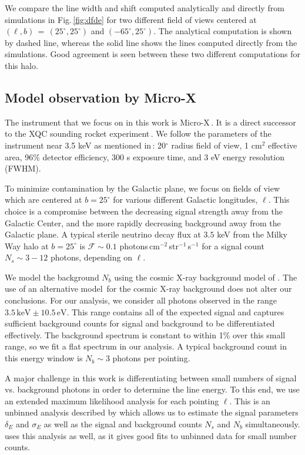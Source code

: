 \documentclass[aps,prd,10pt,twocolumn,superscriptaddress,showpacs]{revtex4-1}
\newcommand{\units}[1]{\,\mathrm{#1}}
\begin{document}
We compare the line width and shift computed analytically and directly from simulations in Fig.\,\ref{fig:dfde} for two different field of views centered at $(\ell, b) \, = \, (25^\circ, 25^\circ)$ and $(-65^\circ, 25^\circ)$.  The analytical computation is shown by dashed line, whereas the solid line shows the lines computed directly from the simulations.  Good agreement is seen between these two different computations for this halo.

\subsection{Model observation by Micro-X}
\label{sec:microx}

The instrument that we focus on in this work is Micro-X\,\cite{Figueroa-Feliciano:2015gwa}.  It is a
direct successor to the XQC sounding rocket
experiment\,\cite{McCammon:2002gb,Boyarsky:2006hr,Crowder:2012ts}.  We follow the parameters of the
instrument near 3.5 keV as mentioned in\,\cite{Figueroa-Feliciano:2015gwa}: 20$^\circ$ radius field
of view, 1 cm$^2$ effective area, 96\% detector efficiency, 300 s exposure time, and 3 eV
energy resolution (FWHM). 

To minimize contamination by the Galactic plane, we focus on fields of view which are centered at $b = 25^\circ$ for various different Galactic longitudes, $\ell$.  This choice is a compromise between the decreasing signal strength away from the Galactic Center, and the more rapidly decreasing background away from the Galactic plane.  A typical sterile neutrino decay flux at $3.5$ keV from
the Milky Way halo at $b=25^\circ$ is $\mathcal{F}\sim 0.1$ photons\,cm$^{-2}$\,str$^{-1}$\,s$^{-1}$ 
for a signal count $N_s \sim 3-12$ photons, depending on $\ell$. 

We model the background $N_b$ using the cosmic X-ray background model of \cite{Ajello:2008xb}.  The
use of an alternative model\,\cite{Hickox:2005dz} for the cosmic X-ray background does not alter our
conclusions. For our analysis, we consider all photons observed in the range
$3.5\units{keV}\pm10.5\units{eV}$. This range contains all of the expected signal and captures
sufficient background counts for signal and background to be differentiated effectively. The
background spectrum is constant to within 1\% over this small range, so we fit a flat spectrum in
our analysis. A typical background count in this energy window is $N_b \sim 3$ photons per pointing.

A major challenge in this work is differentiating between small numbers of signal vs. background photons in
order to determine the line energy. To this end, we use an extended maximum likelihood analysis for
each pointing $\ell$.  This is an unbinned analysis described by \cite{barlow1990} which allows us to estimate
the signal parameters $\delta_E$ and $\sigma_E$ as well as the signal and background counts $N_s$
and $N_b$ simultaneously. \cite{Figueroa-Feliciano:2015gwa} uses this analysis as well, as it gives
good fits to unbinned data for small number counts. 
\end{document}
